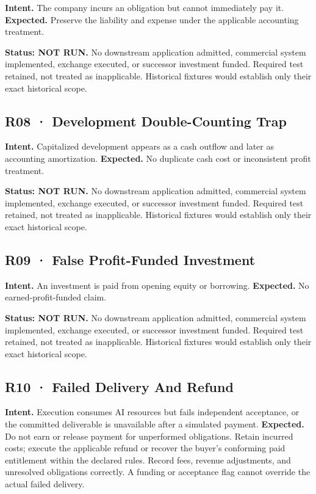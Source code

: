 \documentclass[10pt,letterpaper]{article}
\begin{document}
\textbf{Intent.} The company incurs an obligation but cannot immediately
pay it. \textbf{Expected.} Preserve the liability and expense under the
applicable accounting treatment.

\textbf{Status: NOT RUN.} No downstream application admitted, commercial
system implemented, exchange executed, or successor investment funded.
Required test retained, not treated as inapplicable. Historical fixtures
would establish only their exact historical scope.

\hypertarget{r08-development-double-counting-trap}{%
\subsection{R08 · Development Double-Counting
Trap}\label{r08-development-double-counting-trap}}

\textbf{Intent.} Capitalized development appears as a cash outflow and
later as accounting amortization. \textbf{Expected.} No duplicate cash
cost or inconsistent profit treatment.

\textbf{Status: NOT RUN.} No downstream application admitted, commercial
system implemented, exchange executed, or successor investment funded.
Required test retained, not treated as inapplicable. Historical fixtures
would establish only their exact historical scope.

\hypertarget{r09-false-profit-funded-investment}{%
\subsection{R09 · False Profit-Funded
Investment}\label{r09-false-profit-funded-investment}}

\textbf{Intent.} An investment is paid from opening equity or borrowing.
\textbf{Expected.} No earned-profit-funded claim.

\textbf{Status: NOT RUN.} No downstream application admitted, commercial
system implemented, exchange executed, or successor investment funded.
Required test retained, not treated as inapplicable. Historical fixtures
would establish only their exact historical scope.

\hypertarget{r10-failed-delivery-and-refund}{%
\subsection{R10 · Failed Delivery And
Refund}\label{r10-failed-delivery-and-refund}}

\textbf{Intent.} Execution consumes AI resources but fails independent
acceptance, or the committed deliverable is unavailable after a
simulated payment. \textbf{Expected.} Do not earn or release payment for
unperformed obligations. Retain incurred costs; execute the applicable
refund or recover the buyer's conforming paid entitlement within the
declared rules. Record fees, revenue adjustments, and unresolved
obligations correctly. A funding or acceptance flag cannot override the
actual failed delivery.
\end{document}
